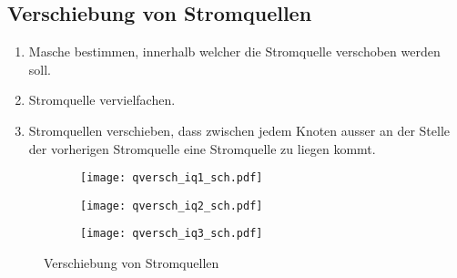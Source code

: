 \newpage
\subsection{Verschiebung von Stromquellen}
\begin{enumerate}
  \item Masche bestimmen, innerhalb welcher die Stromquelle verschoben werden soll. 
  \item Stromquelle vervielfachen. 
  \item Stromquellen verschieben, dass zwischen jedem Knoten ausser an der Stelle der vorherigen Stromquelle eine Stromquelle zu liegen kommt. 
\end{enumerate}
\begin{figure}[h!]
	\centering
	\begin{subfigure}[b]{0.3\textwidth}
		\centering
		\texttt{[image: qversch\_iq1\_sch.pdf]}
		\label{sch:qversch_iq1}
	\end{subfigure}
	\begin{subfigure}[b]{0.3\textwidth}
		\centering
		\texttt{[image: qversch\_iq2\_sch.pdf]}
		\label{sch:qversch_iq2}
	\end{subfigure}
	\begin{subfigure}[b]{0.3\textwidth}
		\centering
		\texttt{[image: qversch\_iq3\_sch.pdf]}
		\label{sch:qversch_iq3}
	\end{subfigure}
	\caption{Verschiebung von Stromquellen}
	\label{sch:qversch_iq}
\end{figure}
